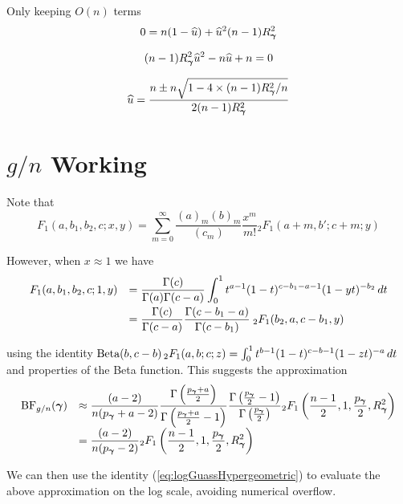 \noindent Only keeping $O(n)$ terms
$$
0
= n(1 - \widehat{u}) 
+ \widehat{u}^2 (n-1) R_{\boldsymbol \gamma}^2 
$$

$$
(n-1) R_{\boldsymbol \gamma}^2 \widehat{u}^2 - n\widehat{u} + n = 0
$$

$$
\widehat{u} = \frac{n \pm n\sqrt{1 - 4 \times (n-1) R_{\boldsymbol \gamma}^2 /n}}{2(n-1) R_{\boldsymbol \gamma}^2}
$$




\section{$g/n$ Working}

Note that
$$
F_1(a,b_1,b_2,c; x,y) = \sum_{m=0}^\infty \frac{(a)_m(b)_m}{(c_m)}\frac{x^m}{m!} {}_2 F_1(a+m,b';c+m;y)
$$


However, when $x\approx 1$ we have
$$
\begin{array}{rl} 
F_1(a,b_1,b_2,c; 1,y) 
& \displaystyle = \frac{\Gamma(c)} {\Gamma(a)\Gamma(c-a)} 
\int_0^1 t^{a-1} (1-t)^{c-b_1-a-1} (1-yt)^{-b_2} \, dt
\\ [2ex]
& \displaystyle 
= \frac{\Gamma(c)} {\Gamma(c-a)} 
\frac{\Gamma(c - b_1 - a)}{\Gamma(c - b_1)}
\frac{}{} 
{}_2  F_1(b_2, a, c - b_1, y)
\end{array} 
$$

\noindent using the identity
$\text{Beta}(b,c-b) \,_2F_1(a,b;c;z) = \int_0^1 t^{b-1} (1-t)^{c-b-1}(1-zt)^{-a} \, dt$ and properties
of the Beta function. This suggests the approximation
$$
\begin{array}{rl} 
\displaystyle \mbox{BF}_{g/n}({\boldsymbol \gamma}) 
& \displaystyle \approx  
\frac{(a - 2)}{n(p_{\boldsymbol \gamma} + a - 2)} 
\frac{\Gamma\left( \tfrac{p_{\boldsymbol \gamma} + a}{2} \right)} {\Gamma\left( \tfrac{p_{\boldsymbol \gamma} + a}{2} - 1 \right)} 
\frac{\Gamma\left( \tfrac{p_{\boldsymbol \gamma}}{2}  - 1 \right)}{\Gamma\left(\frac{p_{\boldsymbol \gamma} }{2} \right)}
{}_2  F_1\left( \frac{n-1}{2}, 1, \frac{p_{\boldsymbol \gamma} }{2}, R_{\boldsymbol \gamma}^2 \right)
\\
& \displaystyle  = \frac{(a - 2)}{n(p_{\boldsymbol \gamma} - 2)} 
{}_2  F_1\left( \frac{n-1}{2}, 1, \frac{p_{\boldsymbol \gamma} }{2}, R_{\boldsymbol \gamma}^2 \right)
\end{array} 
$$

\noindent We can then use
the identity (\ref{eq:logGuassHypergeometric}) 
to evaluate the above approximation
on the log scale, avoiding numerical overflow.


